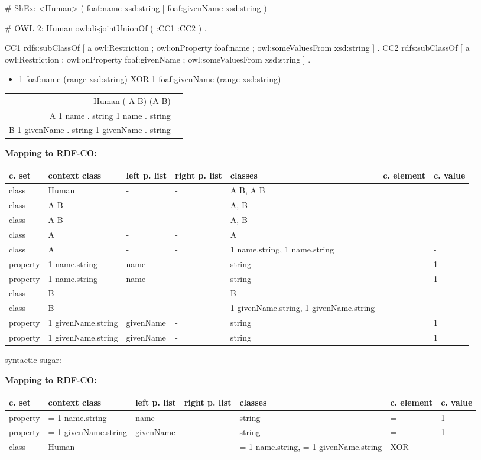 \documentclass{llncs}
\newenvironment{gcotable}{
  \scriptsize
  \sffamily
  \vspace{0cm}
	\begin{center}
	\textbf{\vspace{0.4cm}Mapping to RDF-CO:} \\
  \begin{tabular}{l|l|l|l|l|l|l}
	\hline
  \textbf{c. set} & \textbf{context class} & \textbf{left p. list} & \textbf{right p. list} & \textbf{classes} & \textbf{c. element} & \textbf{c. value} \\
  \hline

}{
  \hline
  \end{tabular}
	\end{center}
}
\newenvironment{DL}{
\vspace{0cm}
	\begin{center}
  \begin{tabular}{r l}

}{
  \end{tabular}
	\end{center}
}
\begin{document}
\begin{ex}
# ShEx:
<Human> { (  
    foaf:name xsd:string | 
    foaf:givenName xsd:string ) }
\end{ex}

\begin{ex}
# OWL 2:
Human owl:disjointUnionOf ( :CC1 :CC2 ) . 

CC1 rdfs:subClassOf [
    a owl:Restriction ;
    owl:onProperty foaf:name ;
    owl:someValuesFrom xsd:string ] .
CC2 rdfs:subClassOf [
    a owl:Restriction ;
    owl:onProperty foaf:givenName ;
    owl:someValuesFrom xsd:string ] .
\end{ex}

\begin{itemize}
	\item 1 foaf:name (range xsd:string) XOR 1 foaf:givenName (range xsd:string)
\end{itemize}

\begin{DL}
Human  ( A  B)  (A   B) \\
A   1 name . string   1 name . string \\
B   1 givenName . string   1 givenName . string \\
\end{DL}

\begin{gcotable}
class & Human & - & - &  A  B, A   B &  \\
\hline
class & A   B & - & - & A,  B &  \\
class &  A  B & - & - &  A, B &  \\
\hline
class &  A & - & - & A &  \\
class & A & - & - &  1 name.string,  1 name.string &  & - \\
property &  1 name.string & name & - & string &  & 1 \\
property &  1 name.string & name & - & string &  & 1 \\
\hline
class &  B & - & - & B &  \\
class & B & - & - &  1 givenName.string,  1 givenName.string &  & - \\
property &  1 givenName.string & givenName & - & string &  & 1 \\
property &  1 givenName.string & givenName & - & string &  & 1 \\
\end{gcotable}

syntactic sugar:
\begin{gcotable}
property & = 1 name.string & name & - & string & = & 1 \\
property & = 1 givenName.string & givenName & - & string & = & 1 \\
class & Human & - & - & = 1 name.string, = 1 givenName.string & XOR \\
\end{gcotable}
\end{document}
